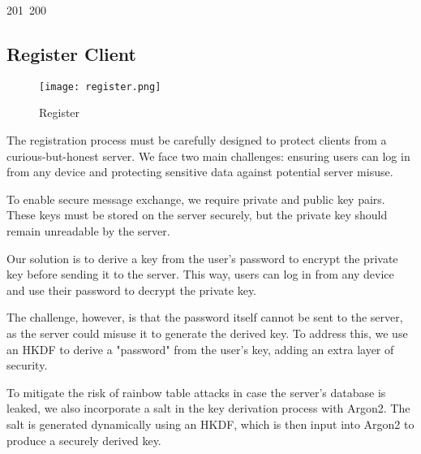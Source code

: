 201~200~\documentclass{article}
\begin{document}
	                                                                \subsection{Register Client}

	                                                                \begin{figure}[ht]
	                                                                    \centering
	                                                                        \texttt{[image: register.png]}
	                                                                            \caption{Register}
	                                                                                \label{fig:enter-label}
	                                                                                \end{figure}

	                                                                                The registration process must be carefully designed to protect clients from a curious-but-honest server. We face two main challenges: ensuring users can log in from any device and protecting sensitive data against potential server misuse.

	                                                                                To enable secure message exchange, we require private and public key pairs. These keys must be stored on the server securely, but the private key should remain unreadable by the server.

	                                                                                Our solution is to derive a key from the user's password to encrypt the private key before sending it to the server. This way, users can log in from any device and use their password to decrypt the private key.

	                                                                                The challenge, however, is that the password itself cannot be sent to the server, as the server could misuse it to generate the derived key. To address this, we use an HKDF to derive a "password" from the user's key, adding an extra layer of security.

	                                                                                To mitigate the risk of rainbow table attacks in case the server's database is leaked, we also incorporate a salt in the key derivation process with Argon2. The salt is generated dynamically using an HKDF, which is then input into Argon2 to produce a securely derived key.
\end{document}
